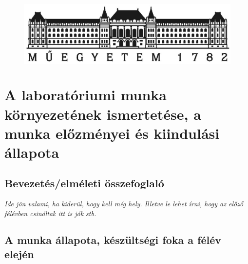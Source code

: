\documentclass[a4paper,oneside]{article}
\begin{document}
\onehalfspacing
\frenchspacing



\begin{titlepage}
 \begin{figure}[h]
    \centering
      \includegraphics[width=12cm]{bme_logo.eps}
  \label{fig:bme_logo}
  \end{figure}
  \thispagestyle{empty}
  \onlabcim

  

  
 
\end{titlepage} 

\section{A laboratóriumi munka környezetének ismertetése, a munka előzményei és kiindulási állapota}
\label{sec:bevezeto}

\subsection{Bevezetés/elméleti összefoglaló}
\label{sec:bevez-ossz}

\textit{Ide jön valami, ha kiderül, hogy kell még hely. Illetve le lehet írni, hogy az előző félévben csináltak itt is jók stb.}

\subsection{A munka állapota, készültségi foka a félév elején}
\label{sec:munka-allap-kesz}
\end{document}
